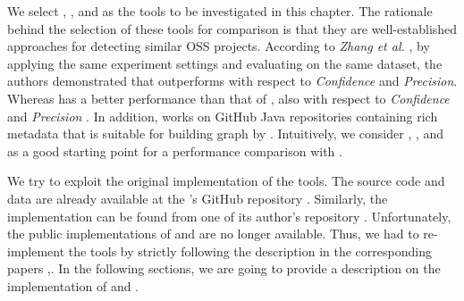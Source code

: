 %
%




We select \MUDABlue, \CLAN, \RepoPal and \CrossSim as the tools to be investigated in this chapter. The rationale behind the selection of these tools for comparison is that they are well-established approaches for detecting similar OSS projects. According to \emph{Zhang et al.} \cite{10.1109/SANER.2017.7884605}, by applying the same experiment settings and evaluating on the same dataset, the authors demonstrated that \RepoPal outperforms \CLAN with respect to \emph{Confidence} and \emph{Precision}. Whereas \CLAN has a better performance than that of \MUDABlue, also with respect to \emph{Confidence} and \emph{Precision} \cite{McMillan:2012:DSS:2337223.2337267}. In addition, \RepoPal works on GitHub Java repositories containing rich metadata that is suitable for building graph by \CrossSim. Intuitively, we consider \MUDABlue, \CLAN, and \RepoPal as a good starting point for a performance comparison with \CrossSim. 

We try to exploit the original implementation of the tools. The \CrossSim source code and data are already available at the \projectName's GitHub repository \cite{CROSSSIM-DATA}. Similarly, the \RepoPal implementation can be found from one of its author's repository \cite{RepoPalImplementation}. Unfortunately, the public implementations of \MUDABlue and \CLAN are no longer available. Thus, we had to re-implement the tools by strictly following the description in the corresponding papers \cite{10.1109/APSEC.2004.69},\cite{McMillan:2012:DSS:2337223.2337267}. In the following sections, we are going to provide a description on the implementation of \MUDABlue and \CLAN.


